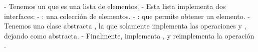 
- Tenemos un  que es una lista de elementos.
- Esta lista implementa dos interfaces:
    - : una colección de elementos.
    - : que permite obtener un elemento.
- Tenemos una clase abstracta , la que solamente
implementa las operaciones  y , dejando 
como abstracta.
- Finalmente,  implementa , y reimplementa la operación
.

